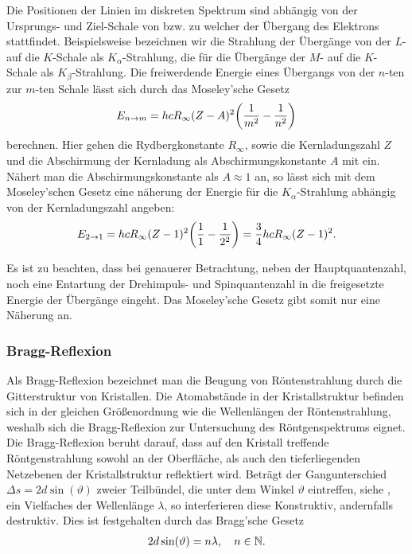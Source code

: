 Die Positionen der Linien im diskreten Spektrum sind abhängig von der Ursprungs- und Ziel-Schale von bzw. zu welcher der Übergang des Elektrons stattfindet. Beispielsweise bezeichnen wir die Strahlung der Übergänge von der $L$- auf die $K$-Schale als $K_{\alpha}$-Strahlung, die für die Übergänge der $M$- auf die $K$-Schale als $K_{\beta}$-Strahlung. Die freiwerdende Energie eines Übergangs von der $n$-ten zur $m$-ten Schale lässt sich durch das Moseley'sche Gesetz
\begin{align}
  E_{n\to m} = hc R_{\infty} (Z-A)^2 \qty(\frac{1}{m^2} - \frac{1}{n^2})
\end{align}
berechnen. Hier gehen die Rydbergkonstante $R_{\infty}$, sowie die Kernladungszahl $Z$ und die Abschirmung der Kernladung als Abschirmungskonstante $A$ mit ein. Nähert man die Abschirmungskonstante als $A \approx 1$ an, so lässt sich mit dem Moseley'schen Gesetz eine näherung der Energie für die $K_{\alpha}$-Strahlung abhängig von der Kernladungszahl angeben:
\begin{align}
  E_{2 \to 1} = hc R_{\infty} (Z - 1)^2 \qty(\frac{1}{1}- \frac{1}{2^2}) = \frac{3}{4} hc R_{\infty} (Z - 1)^2.
\end{align}

Es ist zu beachten, dass bei genauerer Betrachtung, neben der Hauptquantenzahl, noch eine Entartung der Drehimpuls- und Spinquantenzahl in die freigesetzte Energie der Übergänge eingeht. Das Moseley'sche Gesetz gibt somit nur eine Näherung an.

\subsubsection*{Bragg-Reflexion}

Als Bragg-Reflexion bezeichnet man die Beugung von Röntenstrahlung durch die Gitterstruktur von Kristallen. Die Atomabstände in der Kristallstruktur befinden sich in der gleichen Größenordnung wie die Wellenlängen der Röntenstrahlung, weshalb sich die Bragg-Reflexion zur Untersuchung des Röntgenspektrums eignet. Die Bragg-Reflexion beruht darauf, dass auf den Kristall treffende Röntgenstrahlung sowohl an der Oberfläche, als auch den tieferliegenden Netzebenen der Kristallstruktur reflektiert wird. Beträgt der Gangunterschied $\Delta s = 2 d \sin(\vartheta)$ zweier Teilbündel, die unter dem Winkel $\vartheta$ eintreffen, siehe , ein Vielfaches der Wellenlänge $\lambda$, so interferieren diese Konstruktiv, andernfalls destruktiv. Dies ist festgehalten durch das Bragg'sche Gesetz
\begin{align}
  2 d \sin(\vartheta) = n \lambda, \quad n \in \mathbb{N}.
\end{align}

